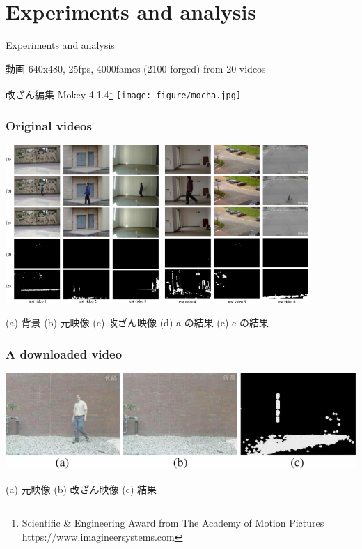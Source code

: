 \section{Experiments and analysis}


\begin{frame}{Experiments and analysis}
\begin{block}{動画}
640x480, 25fps, 4000fames (2100 forged) from 20 videos 
\end{block}
\begin{block}{改ざん編集}
Mokey 4.1.4\footnote{Scientific \& Engineering Award from The Academy of Motion Pictures https://www.imagineersystems.com}
\texttt{[image: figure/mocha.jpg]}
\end{block}
\end{frame}


\begin{frame}\frametitle{Original videos}
\includegraphics[height=6cm]{figure/result1.png}
\includegraphics[height=6cm]{figure/result0.png}

(a) 背景 (b) 元映像 (c) 改ざん映像 (d) a の結果 (e) c の結果
\end{frame}


\begin{frame}\frametitle{A downloaded video}
\includegraphics[width=\textwidth]{figure/result2.png}

(a) 元映像 (b) 改ざん映像 (c) 結果
\end{frame}



